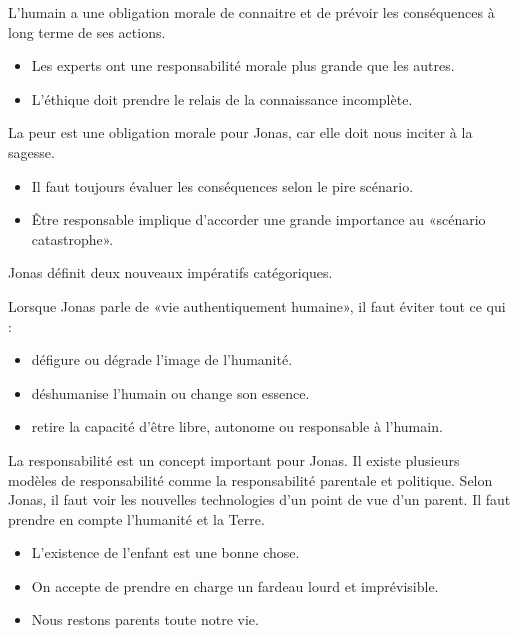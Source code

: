 \documentclass[11pt]{article}
\begin{document}
L'humain a une obligation morale de connaitre et de prévoir les conséquences à long terme de ses actions.
\begin{itemize}  
\item Les experts ont une responsabilité morale plus grande que les autres.
\item L'éthique doit prendre le relais de la connaissance incomplète.
\end{itemize}

La peur est une obligation morale pour Jonas, car elle doit nous inciter à la sagesse.
\begin{itemize}  
\item Il faut toujours évaluer les conséquences selon le pire scénario.
\item Être responsable implique d'accorder une grande importance au «scénario catastrophe».
\end{itemize}


Jonas définit deux nouveaux impératifs catégoriques.


Lorsque Jonas parle de «vie authentiquement humaine», il faut éviter tout ce qui :
\begin{itemize}  
\item défigure ou dégrade l'image de l'humanité.
\item déshumanise l'humain ou change son essence.
\item retire la capacité d'être libre, autonome ou responsable à l'humain.
\end{itemize}


La responsabilité est un concept important pour Jonas. Il existe plusieurs modèles de responsabilité comme la responsabilité parentale et politique. Selon Jonas, il faut voir les nouvelles technologies d'un point de vue d'un parent. Il faut prendre en compte l'humanité et la Terre.
\begin{itemize}  
\item L'existence de l'enfant est une bonne chose.
\item On accepte de prendre en charge un fardeau lourd et imprévisible.
\item Nous restons parents toute notre vie.
\end{itemize}
\end{document}
